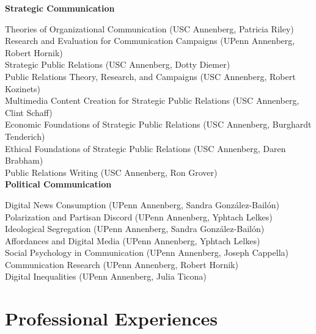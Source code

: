 \documentclass[12pt, letterpaper]{article}
\newcommand{\years}[1]{\marginnote{\normalsize #1}}
\begin{document}
{\textbf{Strategic Communication}

  \years{} Theories of Organizational Communication (USC Annenberg, Patricia Riley)\\
  \years{} Research and Evaluation for Communication Campaigns (UPenn Annenberg, Robert Hornik)\\
  \years{} Strategic Public Relations (USC Annenberg, Dotty Diemer)\\
  \years{} Public Relations Theory, Research, and Campaigns (USC Annenberg, Robert Kozinets)\\
  \years{} Multimedia Content Creation for Strategic Public Relations (USC Annenberg, Clint Schaff)\\
  \years{} Economic Foundations of Strategic Public Relations (USC Annenberg, Burghardt Tenderich)\\
  \years{} Ethical Foundations of Strategic Public Relations (USC Annenberg, Daren Brabham)\\
  \years{} Public Relations Writing (USC Annenberg, Ron Grover)\\

\textbf{Political Communication}

  \years{} Digital News Consumption (UPenn Annenberg, Sandra González-Bailón)\\
  \years{} Polarization and Partisan Discord (UPenn Annenberg, Yphtach Lelkes)\\
  \years{} Ideological Segregation (UPenn Annenberg, Sandra González-Bailón)\\
  \years{} Affordances and Digital Media (UPenn Annenberg, Yphtach Lelkes)\\
  \years{} Social Psychology in Communication (UPenn Annenberg, Joseph Cappella)\\
  \years{} Communication Research (UPenn Annenberg, Robert Hornik)\\
  \years{} Digital Inequalities (UPenn Annenberg, Julia Ticona)


\section*{Professional Experiences}

}
\end{document}
